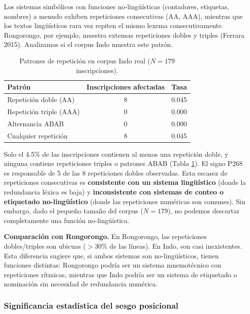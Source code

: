 \documentclass[11pt,a4paper]{article}
\newcommand{\1}{\mathbf{1}}
\numberwithin{equation}{section}
\begin{document}
Los sistemas simbólicos con funciones no-lingüísticas (contadores, etiquetas, nombres) a menudo exhiben repeticiones consecutivas (AA, AAA), mientras que los textos lingüísticos rara vez repiten el mismo lexema consecutivamente. Rongorongo, por ejemplo, muestra extensas repeticiones dobles y triples (Ferrara 2015). Analizamos si el corpus Indo muestra este patrón.

\begin{table}[h]
\centering
\caption{Patrones de repetición en corpus Indo real ($N=179$ inscripciones).}
\label{tab:repetition}
\begin{tabular}{lcc}
\toprule
Patrón & Inscripciones afectadas & Tasa \\
\midrule
Repetición doble (AA) & 8 & 0.045 \\
Repetición triple (AAA) & 0 & 0.000 \\
Alternancia ABAB & 0 & 0.000 \\
Cualquier repetición & 8 & 0.045 \\
\bottomrule
\end{tabular}
\end{table}

Solo el 4.5\% de las inscripciones contienen al menos una repetición doble, y ninguna contiene repeticiones triples o patrones ABAB (Tabla \ref{tab:repetition}). El signo P268 es responsable de 5 de las 8 repeticiones dobles observadas. Esta escasez de repeticiones consecutivas es \textbf{consistente con un sistema lingüístico} (donde la redundancia léxica es baja) y \textbf{inconsistente con sistemas de conteo o etiquetado no-lingüístico} (donde las repeticiones numéricas son comunes). Sin embargo, dado el pequeño tamaño del corpus ($N=179$), no podemos descartar completamente una función no-lingüística.

\textbf{Comparación con Rongorongo.} En Rongorongo, las repeticiones dobles/triples son ubicuas ($>$30\% de las líneas). En Indo, son casi inexistentes. Esta diferencia sugiere que, si ambos sistemas son no-lingüísticos, tienen funciones distintas: Rongorongo podría ser un sistema mnemotécnico con repeticiones rítmicas, mientras que Indo podría ser un sistema de etiquetado o nominación sin necesidad de redundancia numérica.

\subsubsection{Significancia estadística del sesgo posicional}
\end{document}
